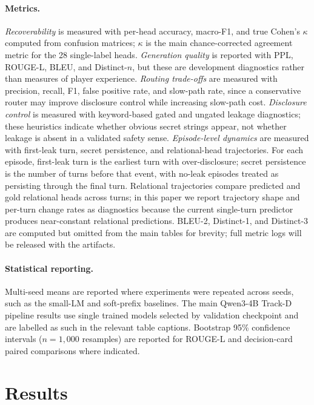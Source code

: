 \documentclass[11pt]{article}
\begin{document}
\paragraph{Metrics.}
\textit{Recoverability} is measured with per-head accuracy, macro-F1, and true Cohen's $\kappa$ computed from confusion matrices; $\kappa$ is the main chance-corrected agreement metric for the 28 single-label heads.
\textit{Generation quality} is reported with PPL, ROUGE-L, BLEU, and Distinct-$n$, but these are development diagnostics rather than measures of player experience.
\textit{Routing trade-offs} are measured with precision, recall, F1, false positive rate, and slow-path rate, since a conservative router may improve disclosure control while increasing slow-path cost.
\textit{Disclosure control} is measured with keyword-based gated and ungated leakage diagnostics; these heuristics indicate whether obvious secret strings appear, not whether leakage is absent in a validated safety sense.
\textit{Episode-level dynamics} are measured with first-leak turn, secret persistence, and relational-head trajectories.
For each episode, first-leak turn is the earliest turn with over-disclosure; secret persistence is the number of turns before that event, with no-leak episodes treated as persisting through the final turn.
Relational trajectories compare predicted and gold relational heads across turns; in this paper we report trajectory shape and per-turn change rates as diagnostics because the current single-turn predictor produces near-constant relational predictions.
BLEU-2, Distinct-1, and Distinct-3 are computed but omitted from the main tables for brevity; full metric logs will be released with the artifacts.

\paragraph{Statistical reporting.} Multi-seed means are reported where experiments were repeated across seeds, such as the small-LM and soft-prefix baselines. The main Qwen3-4B Track-D pipeline results use single trained models selected by validation checkpoint and are labelled as such in the relevant table captions. Bootstrap 95\% confidence intervals ($n{=}1{,}000$ resamples) are reported for ROUGE-L and decision-card paired comparisons where indicated.

\section{Results}
\label{sec:results}
\end{document}
